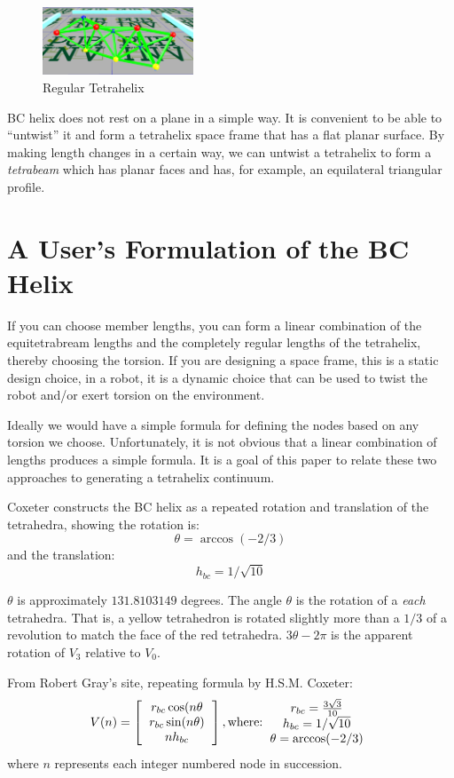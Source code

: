 \documentclass[11pt]{article}
\begin{document}
\begin{figure}[H] %
  \centering
     \includegraphics[width=0.4\textwidth]{figures/Tetrahelix0.png}
     \caption{Regular Tetrahelix}
\end{figure}

BC helix does not rest on a plane in a simple way. It is convenient to be able to ``untwist'' it and form a tetrahelix space frame that
has a flat planar surface. By making length changes in a certain way, we can untwist a tetrahelix to form a \emph{tetrabeam} which
has planar faces and has, for example, an equilateral triangular profile.

\section{A User's Formulation of the BC Helix}

If you can choose member lengths, you can form a linear combination of the equitetrabream lengths and the completely regular
lengths of the tetrahelix, thereby choosing the torsion.  If you are designing a space frame, this is a static design choice,
in a robot, it is a dynamic choice that can be used to twist the robot and/or exert torsion on the environment.

Ideally we would have a simple formula for defining the nodes based on any torsion we choose.
Unfortunately, it is not obvious that a linear combination of lengths produces a simple formula.
It is a goal of this paper to relate these two approaches to generating a tetrahelix continuum.

Coxeter constructs the BC helix\cite{coxeter1985simplicial} as a repeated rotation and translation of the tetrahedra, showing the
rotation is:
\[
\theta = \arccos(-2/3) 
\]
and the translation:
\[
h_{bc} = 1/\sqrt{10}
\]


$\theta$ is approximately $131.8103149$ degrees.
The angle $\theta$ is the rotation of a \emph{each} tetrahedra.
That is, a yellow tetrahedron is rotated slightly more than a $1/3$ of a revolution to match the face of the red tetrahedra.
$3 \theta - 2\pi$ is the apparent rotation of $V_3$ relative to $V_0$.

From Robert Gray's site, repeating formula by H.S.M. Coxeter:
\[
V(n) =
\left [
  \begin{tabular}{c}
   $ r_{bc} \cos(n \theta $\\
   $ r_{bc} \sin(n \theta) $\\
   $ n h_{bc}  $
  \end{tabular}
  \right ],
\text{where:}
  \begin{tabular}{c}
 $ r_{bc} = \frac{3\sqrt{3}}{10} $\\
 $ h_{bc} = 1/\sqrt{10} $ \\
 $ \theta = \arccos(-2/3) $ \\
  \end{tabular}      
\]
where $n$ represents each integer numbered node in succession.
\end{document}
